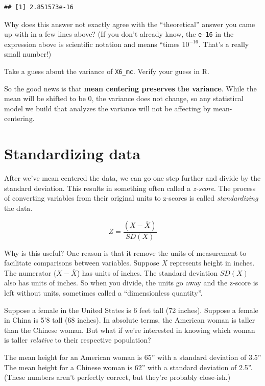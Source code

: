 \documentclass[
]{book}
\begin{document}
\begin{verbatim}
## [1] 2.851573e-16
\end{verbatim}

Why does this answer not exactly agree with the ``theoretical'' answer you came up with in a few lines above? (If you don't already know, the \texttt{e-16} in the expression above is scientific notation and means ``times \(10^{-16}\). That's a really small number!)

Take a guess about the variance of \texttt{X6\_mc}. Verify your guess in R.

So the good news is that \textbf{mean centering preserves the variance}. While the mean will be shifted to be 0, the variance does not change, so any statistical model we build that analyzes the variance will not be affecting by mean-centering.

\hypertarget{variance-standardizing}{%
\section{Standardizing data}\label{variance-standardizing}}

After we've mean centered the data, we can go one step further and divide by the standard deviation. This results in something often called a \emph{z-score}. The process of converting variables from their original units to z-scores is called \emph{standardizing} the data.

\[
Z = \frac{\left(X - \overline{X}\right)}{SD(X)}
\]

Why is this useful? One reason is that it remove the units of measurement to facilitate comparisons between variables. Suppose \(X\) represents height in inches. The numerator (\(X - \overline{X}\)) has units of inches. The standard deviation \(SD(X)\) also has units of inches. So when you divide, the units go away and the z-score is left without units, sometimes called a ``dimensionless quantity''.

Suppose a female in the United States is 6 feet tall (72 inches). Suppose a female in China is 5'8 tall (68 inches). In absolute terms, the American woman is taller than the Chinese woman. But what if we're interested in knowing which woman is taller \emph{relative} to their respective population?

The mean height for an American woman is 65'' with a standard deviation of 3.5'' The mean height for a Chinese woman is 62'' with a standard deviation of 2.5''. (These numbers aren't perfectly correct, but they're probably close-ish.)
\end{document}
